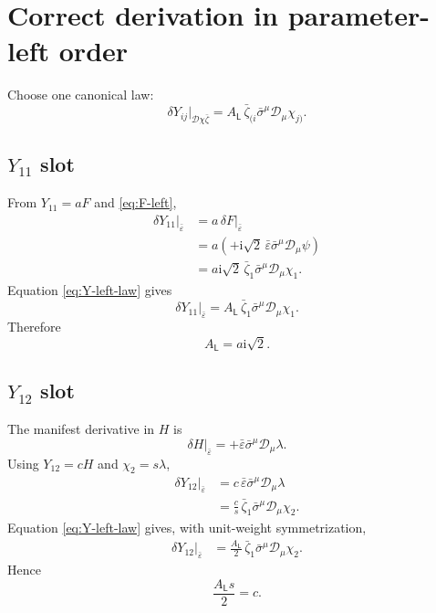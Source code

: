 \documentclass[11pt,a4paper,UTF8]{ctexart}
\numberwithin{equation}{section}
\newcommand{\ii}{\mathrm i}
\newcommand{\cD}{\mathcal D}
\newcommand{\eps}{\varepsilon}
\newcommand{\PL}{\mathsf L}
\newcommand{\slot}{\big\vert}
\begin{document}
\section{Correct derivation in parameter-left order}

Choose one canonical law:
\begin{equation}
\boxed{
\delta Y_{ij}\slot_{\cD\chi\bar\zeta}
=A_{\PL}\,\bar\zeta_{(i}\bar\sigma^\mu\cD_\mu\chi_{j)}.}
\label{eq:Y-left-law}
\end{equation}

\subsection{$Y_{11}$ slot}

From $Y_{11}=aF$ and \cref{eq:F-left},
\begin{align}
\delta Y_{11}\slot_{\bar\eps}
&=a\,\delta F\slot_{\bar\eps}
\\
&=a\left(+\ii\sqrt2\,\bar\eps\bar\sigma^\mu\cD_\mu\psi\right)
\\
&=a\ii\sqrt2\,\bar\zeta_1\bar\sigma^\mu\cD_\mu\chi_1.
\end{align}
Equation \eqref{eq:Y-left-law} gives
\[
\delta Y_{11}\slot_{\bar\eps}
=A_{\PL}\,\bar\zeta_1\bar\sigma^\mu\cD_\mu\chi_1.
\]
Therefore
\begin{equation}
\boxed{A_{\PL}=a\ii\sqrt2.}
\label{eq:AL-a}
\end{equation}

\subsection{$Y_{12}$ slot}

The manifest derivative in $H$ is
\[
\delta H\slot_{\bar\eps}
=+\bar\eps\bar\sigma^\mu\cD_\mu\lambda.
\]
Using $Y_{12}=cH$ and $\chi_2=s\lambda$,
\begin{align}
\delta Y_{12}\slot_{\bar\eps}
&=c\,\bar\eps\bar\sigma^\mu\cD_\mu\lambda
\\
&=\frac cs\,\bar\zeta_1\bar\sigma^\mu\cD_\mu\chi_2.
\end{align}
Equation \eqref{eq:Y-left-law} gives, with unit-weight symmetrization,
\begin{align}
\delta Y_{12}\slot_{\bar\eps}
&=\frac{A_{\PL}}2\,
\bar\zeta_1\bar\sigma^\mu\cD_\mu\chi_2.
\end{align}
Hence
\begin{equation}
\boxed{\frac{A_{\PL}s}{2}=c.}
\label{eq:c-AL}
\end{equation}
\end{document}
